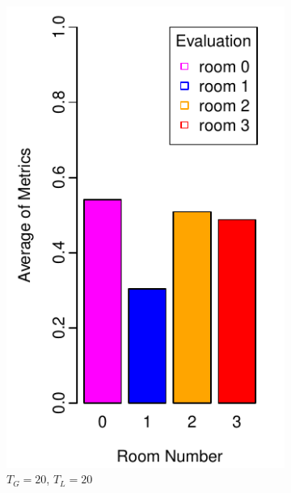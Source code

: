 \documentclass{llncs}
\begin{document}
\begin{figure}[h!]
\begin{subfigure}[b]{0.67\textwidth}
                \label{fig:exp1}
        \end{subfigure}
        
        \begin{subfigure}[b]{0.25\textwidth}
                \includegraphics[width=\textwidth]{PLOT/EVAL/eval9}
                \caption{$T_G = 20$, $T_L = 20$}
                \label{fig:eval1}
        \end{subfigure}%
        \qquad
        \begin{subfigure}[b]{0.67\textwidth}

\end{subfigure}
\end{figure}
\end{document}
